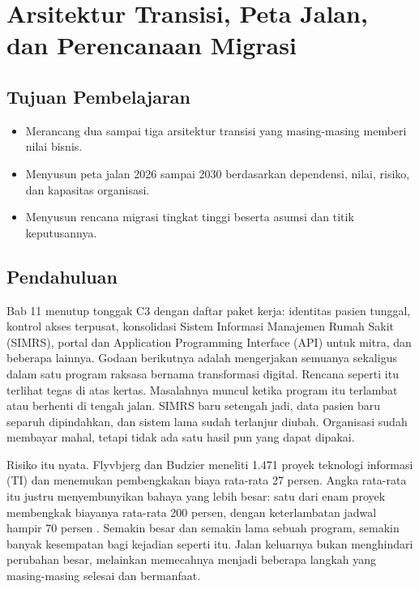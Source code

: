 \chapter{Arsitektur Transisi, Peta Jalan, dan Perencanaan Migrasi}
\label{ch:ch12}

\section*{Tujuan Pembelajaran}
\begin{itemize}
  \item Merancang dua sampai tiga arsitektur transisi yang masing-masing memberi nilai bisnis.
  \item Menyusun peta jalan 2026 sampai 2030 berdasarkan dependensi, nilai, risiko, dan kapasitas organisasi.
  \item Menyusun rencana migrasi tingkat tinggi beserta asumsi dan titik keputusannya.
\end{itemize}

\section{Pendahuluan}

Bab 11 menutup tonggak C3 dengan daftar paket kerja: identitas pasien tunggal,
kontrol akses terpusat, konsolidasi Sistem Informasi Manajemen Rumah Sakit
(SIMRS), portal dan Application Programming Interface (API) untuk mitra, dan
beberapa lainnya. Godaan berikutnya adalah mengerjakan semuanya sekaligus dalam
satu program raksasa bernama transformasi digital. Rencana seperti itu terlihat
tegas di atas kertas. Masalahnya muncul ketika program itu terlambat atau
berhenti di tengah jalan. SIMRS baru setengah jadi, data pasien baru separuh
dipindahkan, dan sistem lama sudah terlanjur diubah. Organisasi sudah membayar
mahal, tetapi tidak ada satu hasil pun yang dapat dipakai.

Risiko itu nyata. Flyvbjerg dan Budzier meneliti 1.471 proyek teknologi
informasi (TI) dan menemukan pembengkakan biaya rata-rata 27 persen. Angka
rata-rata itu justru menyembunyikan bahaya yang lebih besar: satu dari enam
proyek membengkak biayanya rata-rata 200 persen, dengan keterlambatan jadwal
hampir 70 persen \cite{flyvbjerg2011}. Semakin besar dan semakin lama sebuah
program, semakin banyak kesempatan bagi kejadian seperti itu. Jalan keluarnya
bukan menghindari perubahan besar, melainkan memecahnya menjadi beberapa langkah
yang masing-masing selesai dan bermanfaat.

